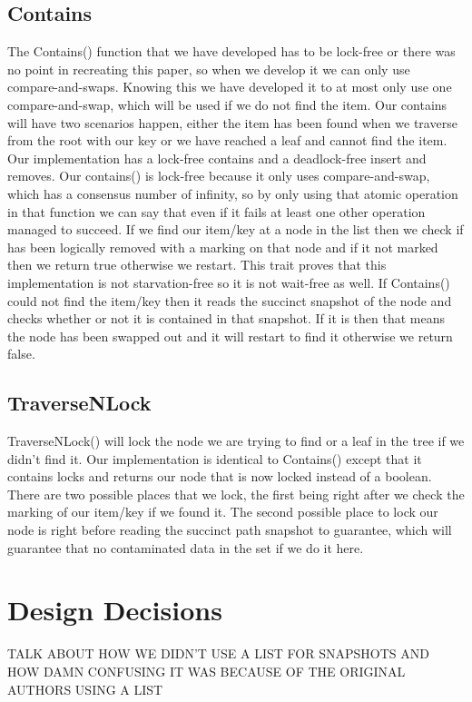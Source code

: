 \documentclass[conference]{IEEEtran}
\begin{document}
\subsection{Contains}
The Contains() function that we have developed has to be lock-free or there was no point in recreating this paper, so when we develop it we can only use compare-and-swaps. Knowing this we have developed it to at most only use one compare-and-swap, which will be used if we do not find the item. Our contains will have two scenarios happen, either the item has been found when we traverse from the root with our key or we have reached a leaf and cannot find the item.
Our implementation has a lock-free contains and a deadlock-free insert and removes. Our contains() is lock-free because it only uses compare-and-swap, which has a consensus number of infinity, so by only using that atomic operation in that function we can say that even if it fails at least one other operation managed to succeed. If we find our item/key at a node in the list then we check if has been logically removed with a marking on that node and if it not marked then we return true otherwise we restart. This trait proves that this implementation is not starvation-free so it is not wait-free as well. If Contains() could not find the item/key then it reads the succinct snapshot of the node and checks whether or not it is contained in that snapshot. If it is then that means the node has been swapped out and it will restart to find it otherwise we return false.
\subsection{TraverseNLock}
TraverseNLock() will lock the node we are trying to find or a leaf in the tree if we didn't find it. Our implementation is identical to Contains() except that it contains locks and returns our node that is now locked instead of a boolean. There are two possible places that we lock, the first being right after we check the marking of our item/key if we found it. The second possible place to lock our node is right before reading the succinct path snapshot to guarantee, which will guarantee that no contaminated data in the set if we do it here.
\section{Design Decisions}

TALK ABOUT HOW WE DIDN'T USE A LIST FOR SNAPSHOTS AND HOW DAMN CONFUSING IT WAS BECAUSE OF THE ORIGINAL AUTHORS USING A LIST
\end{document}
